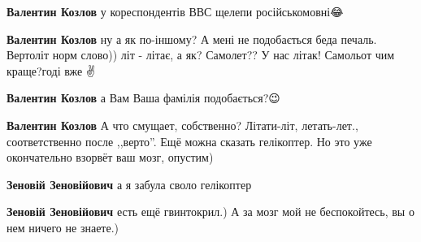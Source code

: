 \begin{itemize}
\begin{itemize}
\textbf{Валентин Козлов} у кореспондентів ВВС щелепи російськомовні😂

 
\textbf{Валентин Козлов} ну а як по-іншому? А мені не подобається беда печаль. Вертоліт норм слово)) літ - літає, а як? Самолет?? У нас літак! Самольот чим краще?\Laughey[1.0][white] годі вже ✌\Laughey[1.0][white]

 
\textbf{Валентин Козлов} а Вам Ваша фамілія подобається?😉\Laughey[1.0][white]

 
\textbf{Валентин Козлов} А что смущает, собственно?
Літати-літ, летать-лет., соответственно после ,,верто''. Ещё можна сказать
гелікоптер. Но это уже окончательно взорвёт ваш мозг, опустим)

\begin{itemize}
 
\textbf{Зеновій Зеновійович} а я забула своло гелікоптер\Laughey[1.0][white]

 
\textbf{Зеновій Зеновійович} есть ещё гвинтокрил.) А за мозг мой не беспокойтесь, вы о нем ничего не знаете.)

 

\end{itemize}
\end{itemize}
\end{itemize}
